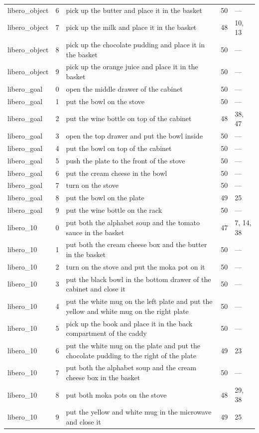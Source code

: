 \begin{table}[H]
\begin{tabular}{@{}l r p{7.0cm} r l@{}}
    libero\_object & 6 & pick up the butter and place it in the basket & 50 & --- \\
    libero\_object & 7 & pick up the milk and place it in the basket & 48 & 10, 13 \\
    libero\_object & 8 & pick up the chocolate pudding and place it in the basket & 50 & --- \\
    libero\_object & 9 & pick up the orange juice and place it in the basket & 50 & --- \\
    libero\_goal & 0 & open the middle drawer of the cabinet & 50 & --- \\
    libero\_goal & 1 & put the bowl on the stove & 50 & --- \\
    libero\_goal & 2 & put the wine bottle on top of the cabinet & 48 & 38, 47 \\
    libero\_goal & 3 & open the top drawer and put the bowl inside & 50 & --- \\
    libero\_goal & 4 & put the bowl on top of the cabinet & 50 & --- \\
    libero\_goal & 5 & push the plate to the front of the stove & 50 & --- \\
    libero\_goal & 6 & put the cream cheese in the bowl & 50 & --- \\
    libero\_goal & 7 & turn on the stove & 50 & --- \\
    libero\_goal & 8 & put the bowl on the plate & 49 & 25 \\
    libero\_goal & 9 & put the wine bottle on the rack & 50 & --- \\
    libero\_10 & 0 & put both the alphabet soup and the tomato sauce in the basket & 47 & 7, 14, 38 \\
    libero\_10 & 1 & put both the cream cheese box and the butter in the basket & 50 & --- \\
    libero\_10 & 2 & turn on the stove and put the moka pot on it & 50 & --- \\
    libero\_10 & 3 & put the black bowl in the bottom drawer of the cabinet and close it & 50 & --- \\
    libero\_10 & 4 & put the white mug on the left plate and put the yellow and white mug on the right plate & 50 & --- \\
    libero\_10 & 5 & pick up the book and place it in the back compartment of the caddy & 50 & --- \\
    libero\_10 & 6 & put the white mug on the plate and put the chocolate pudding to the right of the plate & 49 & 23 \\
    libero\_10 & 7 & put both the alphabet soup and the cream cheese box in the basket & 50 & --- \\
    libero\_10 & 8 & put both moka pots on the stove & 48 & 29, 38 \\
    libero\_10 & 9 & put the yellow and white mug in the microwave and close it & 49 & 25 \\
    \bottomrule
  \end{tabular}
\end{table}

